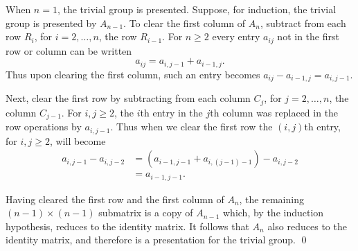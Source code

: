 \documentclass[../algebraNotesMSRI-UP2016.tex]{subfiles}
\begin{document}
\begin{frame}
When $n=1$, the trivial group is presented.  Suppose, for induction, the trivial group is presented by $A_{n-1}$.  To clear the first column of $A_n$, subtract from each row $R_i$, for $i=2,\dots,n$, the row $R_{i-1}$.  For $n\geq 2$ every entry $a_{ij}$ not in the first row or column can be written 
\[
a_{ij}=a_{i,j-1}+a_{i-1,j}.
\]
Thus upon clearing the first column, such an entry becomes $a_{ij}-a_{i-1,j}=a_{i,j-1}$.  

\smallGap
Next, clear the first row by subtracting from each column $C_j$, for $j=2,\dots,n$, the column $C_{j-1}$.  For $i,j\geq 2$, the $i$th entry in the $j$th column was replaced in the row operations by $a_{i,j-1}$.  Thus when we clear the first row the $(i,j)$th entry, for $i,j\geq 2$, will become 
\begin{align*}
a_{i,j-1}-a_{i,j-2} &= (a_{i-1,j-1}+a_{i,(j-1)-1})-a_{i,j-2} \\
	&= a_{i-1,j-1}.
\end{align*}

Having cleared the first row and the first column of $A_n$, the remaining $(n-1)\times (n-1)$ submatrix is a copy of $A_{n-1}$ which, by the induction hypothesis, reduces to the identity matrix.  It follows that $A_n$ also reduces to the identity matrix, and therefore is a presentation for the trivial group.
\qed
\end{frame}

\end{document}
